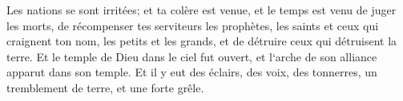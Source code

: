 \verse Les nations se sont irritées; et ta colère est venue, et le temps est venu de juger les morts, de récompenser tes serviteurs les prophètes, les saints et ceux qui craignent ton nom, les petits et les grands, et de détruire ceux qui détruisent la terre. 
\verse Et le temple de Dieu dans le ciel fut ouvert, et l`arche de son alliance apparut dans son temple. Et il y eut des éclairs, des voix, des tonnerres, un tremblement de terre, et une forte grêle. 

\chapter{}

